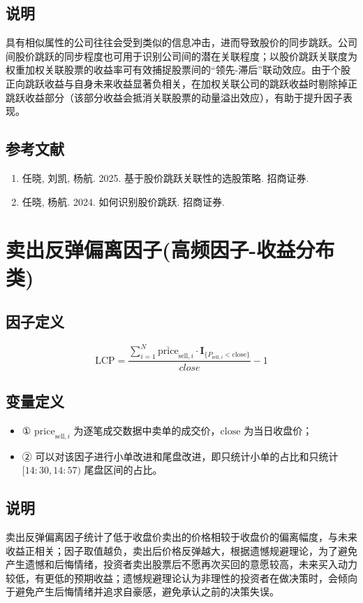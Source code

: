 \documentclass{article}
\begin{document}
\subsection{说明}
具有相似属性的公司往往会受到类似的信息冲击，进而导致股价的同步跳跃。公司间股价跳跃的同步程度也可用于识别公司间的潜在关联程度；以股价跳跃关联度为权重加权关联股票的收益率可有效捕捉股票间的“领先-滞后”联动效应。由于个股正向跳跃收益与自身未来收益显著负相关，在加权关联公司的跳跃收益时剔除掉正跳跃收益部分（该部分收益会抵消关联股票的动量溢出效应），有助于提升因子表现。

\subsection{参考文献}
\begin{enumerate}
    \item 任晓, 刘凯, 杨航. 2025. 基于股价跳跃关联性的选股策略. 招商证券.
    \item 任晓, 杨航. 2024. 如何识别股价跳跃. 招商证券.
\end{enumerate}

\section{卖出反弹偏离因子(高频因子-收益分布类)}

\subsection{因子定义}
\begin{equation}
    \mathrm{LCP} = \frac{\sum_{i=1}^{N} \overline{\mathrm{price}}_{\mathrm{sell},i} \cdot \mathbf{I}_{\{P_{\mathrm{sell},i} < \mathrm{close}\}}}{close} - 1
\end{equation}

\subsection{变量定义}
\begin{itemize}
    \item ① \( \mathrm{price}_{\mathrm{sell},i} \) 为逐笔成交数据中卖单的成交价，\( \mathrm{close} \) 为当日收盘价；
    \item ② 可以对该因子进行小单改进和尾盘改进，即只统计小单的占比和只统计 \([14:30,14:57)\) 尾盘区间的占比。
\end{itemize}

\subsection{说明}
卖出反弹偏离因子统计了低于收盘价卖出的价格相较于收盘价的偏离幅度，与未来收益正相关；因子取值越负，卖出后价格反弹越大，根据遗憾规避理论，为了避免产生遗憾和后悔情绪，投资者卖出股票后不愿再次买回的意愿较高，未来买入动力较低，有更低的预期收益；遗憾规避理论认为非理性的投资者在做决策时，会倾向于避免产生后悔情绪并追求自豪感，避免承认之前的决策失误。
\end{document}
